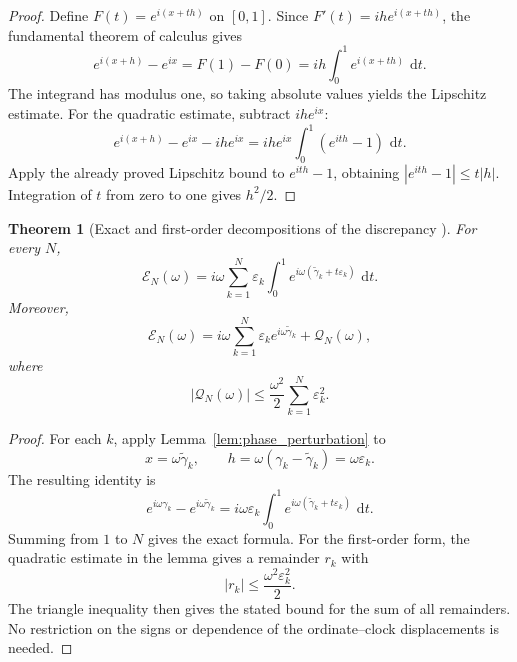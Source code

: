 \documentclass[11pt]{amsart}
\numberwithin{equation}{section}
\theoremstyle{plain}
\newtheorem{theorem}{Theorem}[section]
\theoremstyle{definition}
\theoremstyle{remark}
\newcommand{\1}{\mathbf{1}}
\newcommand{\dd}{\,\mathrm{d}}
\begin{document}
\begin{proof}
Define \(F(t)=e^{i(x+th)}\) on \([0,1]\).  Since
\(F'(t)=ihe^{i(x+th)}\), the fundamental theorem of calculus gives
\begin{equation}
e^{i(x+h)}-e^{ix}
=
F(1)-F(0)
=
ih\int_0^1e^{i(x+th)}\,\dd t.
\label{eq:phase_perturbation_ftc_detailed}
\end{equation}
The integrand has modulus one, so taking absolute values yields the
Lipschitz estimate.  For the quadratic estimate, subtract \(ihe^{ix}\):
\begin{equation}
e^{i(x+h)}-e^{ix}-ihe^{ix}
=
ihe^{ix}\int_0^1(e^{ith}-1)\,\dd t.
\label{eq:phase_quadratic_identity_detailed}
\end{equation}
Apply the already proved Lipschitz bound to \(e^{ith}-1\), obtaining
\(|e^{ith}-1|\leq t|h|\).  Integration of \(t\) from zero to one gives
\(h^2/2\).
\end{proof}


\begin{theorem}[Exact and first-order decompositions of the discrepancy {}]
\label{thm:indexed_discrepancy_decomposition}
For every \(N\),
\begin{equation}
\mathcal E_N(\omega)
=
i\omega
\sum_{k=1}^{N}
\varepsilon_k
\int_0^1
 e^{i\omega(\widetilde\gamma_k+t\varepsilon_k)}\,\dd t.
\label{eq:exact_indexed_discrepancy}
\end{equation}
Moreover,
\begin{equation}
\mathcal E_N(\omega)
=
i\omega\sum_{k=1}^{N}
\varepsilon_ke^{i\omega\widetilde\gamma_k}
+
\mathcal Q_N(\omega),
\label{eq:first_order_indexed_discrepancy}
\end{equation}
where
\begin{equation}
|\mathcal Q_N(\omega)|
\leq
\frac{\omega^2}{2}
\sum_{k=1}^{N}\varepsilon_k^2.
\label{eq:indexed_discrepancy_remainder}
\end{equation}
\end{theorem}

\begin{proof}
For each \(k\), apply Lemma~\ref{lem:phase_perturbation} to
\begin{equation}
x=\omega\widetilde\gamma_k,
\qquad
h=\omega(\gamma_k-\widetilde\gamma_k)=\omega\varepsilon_k.
\label{eq:indexed_discrepancy_substitution}
\end{equation}
The resulting identity is
\begin{equation}
e^{i\omega\gamma_k}-e^{i\omega\widetilde\gamma_k}
=
i\omega\varepsilon_k
\int_0^1e^{i\omega(\widetilde\gamma_k+t\varepsilon_k)}\,\dd t.
\label{eq:indexed_discrepancy_termwise}
\end{equation}
Summing from \(1\) to \(N\) gives the exact formula.  For the first-order
form, the quadratic estimate in the lemma gives a remainder \(r_k\) with
\begin{equation}
|r_k|\leq\frac{\omega^2\varepsilon_k^2}{2}.
\label{eq:indexed_term_remainder_bound}
\end{equation}
The triangle inequality then gives the stated bound for the sum of all
remainders.  No restriction on the signs or dependence of the ordinate--clock displacements
is needed.
\end{proof}
\end{document}
